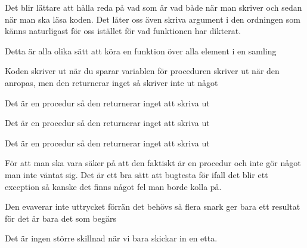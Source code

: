 \Subtask
Det blir lättare att hålla reda på vad som är vad både när man skriver och sedan när man ska läsa koden. Det låter oss även skriva argument i den ordningen som känns naturligast för oss istället för vad funktionen har dikterat.

\Task
Detta är alla olika sätt att köra en funktion över alla element i en samling

\Subtask {}

\Subtask {}

\Subtask {}

\Subtask {}

\Subtask {}

\Subtask {}

\Subtask {}

\Subtask {}

\Task

\Subtask {}

\Subtask {}

\Subtask Koden skriver ut  när du sparar variablen för proceduren skriver ut när den anropas, men den returnerar inget så  skriver inte ut något

\Subtask Det är en procedur så den returnerar inget att skriva ut

\Subtask Det är en procedur så den returnerar inget att skriva ut

\Subtask Det är en procedur så den returnerar inget att skriva ut

\Subtask För att man ska vara säker på att den faktiskt är en procedur och inte gör något man inte väntat sig. Det är ett bra sätt att bugtesta för ifall det blir ett exception så kanske det finns något fel man borde kolla på.

\Task

\Subtask {}

\Subtask {}

Den evaverar inte uttrycket förrän det behövs så flera snark ger bara ett resultat för det är bara det som begärs

\Subtask {}

\Subtask {}

Det är ingen större skillnad när vi bara skickar in en etta.

